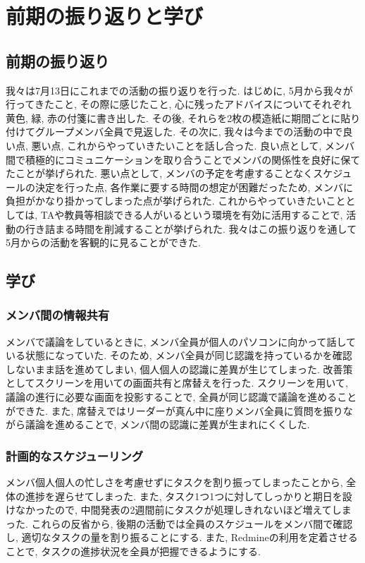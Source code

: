 \chapter{前期の振り返りと学び}

\section{前期の振り返り}
我々は7月13日にこれまでの活動の振り返りを行った.
はじめに, 5月から我々が行ってきたこと, その際に感じたこと,
心に残ったアドバイスについてそれぞれ黄色, 緑, 赤の付箋に書き出した.
その後, それらを2枚の模造紙に期間ごとに貼り付けてグループメンバ全員で見返した.
その次に, 我々は今までの活動の中で良い点, 悪い点, これからやっていきたいことを話し合った.
良い点として, メンバ間で積極的にコミュニケーションを取り合うことでメンバの関係性を良好に保てたことが挙げられた.
悪い点として, メンバの予定を考慮することなくスケジュールの決定を行った点, 各作業に要する時間の想定が困難だったため,
メンバに負担がかなり掛かってしまった点が挙げられた.
これからやっていきたいこととしては, TAや教員等相談できる人がいるという環境を有効に活用することで, 活動の行き詰まる時間を削減することが挙げられた.
我々はこの振り返りを通して5月からの活動を客観的に見ることができた.

\section{学び}
\subsection{メンバ間の情報共有}
メンバで議論をしているときに, メンバ全員が個人のパソコンに向かって話している状態になっていた. そのため, メンバ全員が同じ認識を持っているかを確認しないまま話を進めてしまい, 個人個人の認識に差異が生じてしまった. 改善策としてスクリーンを用いての画面共有と席替えを行った. スクリーンを用いて, 議論の進行に必要な画面を投影することで, 全員が同じ認識で議論を進めることができた. また, 席替えではリーダーが真ん中に座りメンバ全員に質問を振りながら議論を進めることで, メンバ間の認識に差異が生まれにくくした.
\subsection{計画的なスケジューリング}
メンバ個人個人の忙しさを考慮せずにタスクを割り振ってしまったことから, 全体の進捗を遅らせてしまった. また, タスク1つ1つに対してしっかりと期日を設けなかったので, 中間発表の2週間前にタスクが処理しきれないほど増えてしまった. これらの反省から, 後期の活動では全員のスケジュールをメンバ間で確認し, 適切なタスクの量を割り振ることにする. また, Redmineの利用を定着させることで, タスクの進捗状況を全員が把握できるようにする.
